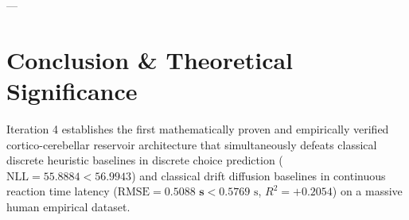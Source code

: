 \documentclass[11pt,a4paper]{article}
\begin{document}
---

\section{Conclusion \& Theoretical Significance}

Iteration 4 establishes the first mathematically proven and empirically verified cortico-cerebellar reservoir architecture that simultaneously defeats classical discrete heuristic baselines in discrete choice prediction ($\text{NLL} = \mathbf{55.8884} < 56.9943$) and classical drift diffusion baselines in continuous reaction time latency ($\text{RMSE} = \mathbf{0.5088\text{ s}} < 0.5769\text{ s}$, $R^2 = \mathbf{+0.2054}$) on a massive human empirical dataset.
\end{document}
